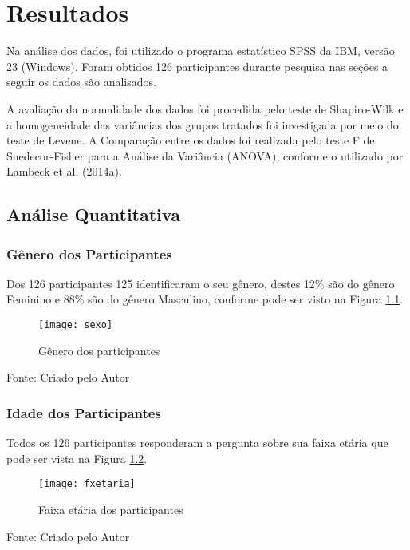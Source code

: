 \chapter{Resultados} \label{Resultados} 

Na análise dos dados, foi utilizado o programa estatístico SPSS da IBM, versão 23 (Windows).\newline
\indent Foram obtidos 126 participantes durante pesquisa nas seções a seguir os  dados são analisados.

\indent A avaliação da normalidade dos dados foi procedida pelo teste de Shapiro-Wilk e a homogeneidade das variâncias dos grupos tratados foi investigada por meio do teste de Levene. A Comparação entre os dados foi realizada pelo teste F de Snedecor-Fisher para a Análise da Variância (ANOVA), conforme o utilizado por Lambeck et al. (2014a). \newline

\section{Análise Quantitativa}

\subsection{Gênero dos Participantes}
Dos 126 participantes 125 identificaram o seu gênero, destes 12\% são do gênero Feminino e 88\% são do gênero Masculino, conforme pode ser visto na Figura \ref{fig:figura-sexo}.

\begin{figure}[H]
	\centering	
	\caption{Gênero dos participantes}
	\texttt{[image: sexo]}
	\label{fig:figura-sexo}
\end{figure}
\vspace{-0.8 cm} \hspace{3.85 cm} Fonte: Criado pelo Autor\newline

\subsection{Idade dos Participantes}
Todos os 126 participantes responderam a pergunta sobre sua faixa etária que pode ser vista na Figura \ref{fig:figura-fxetaria}.

\begin{figure}[H]
	\centering	
	\caption{Faixa etária dos participantes}
	\texttt{[image: fxetaria]}
	\label{fig:figura-fxetaria}
\end{figure}
\vspace{-0.8 cm} \hspace{3.55 cm} Fonte: Criado pelo Autor\newline

